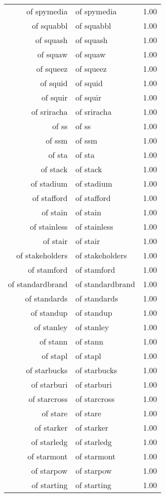\begin{table}[ht]
\begin{tabular}{rlr}
  of spymedia & of spymedia & 1.00 \\ 
  of squabbl & of squabbl & 1.00 \\ 
  of squash & of squash & 1.00 \\ 
  of squaw & of squaw & 1.00 \\ 
  of squeez & of squeez & 1.00 \\ 
  of squid & of squid & 1.00 \\ 
  of squir & of squir & 1.00 \\ 
  of sriracha & of sriracha & 1.00 \\ 
  of ss & of ss & 1.00 \\ 
  of ssm & of ssm & 1.00 \\ 
  of sta & of sta & 1.00 \\ 
  of stack & of stack & 1.00 \\ 
  of stadium & of stadium & 1.00 \\ 
  of stafford & of stafford & 1.00 \\ 
  of stain & of stain & 1.00 \\ 
  of stainless & of stainless & 1.00 \\ 
  of stair & of stair & 1.00 \\ 
  of stakeholders & of stakeholders & 1.00 \\ 
  of stamford & of stamford & 1.00 \\ 
  of standardbrand & of standardbrand & 1.00 \\ 
  of standards & of standards & 1.00 \\ 
  of standup & of standup & 1.00 \\ 
  of stanley & of stanley & 1.00 \\ 
  of stann & of stann & 1.00 \\ 
  of stapl & of stapl & 1.00 \\ 
  of starbucks & of starbucks & 1.00 \\ 
  of starburi & of starburi & 1.00 \\ 
  of starcross & of starcross & 1.00 \\ 
  of stare & of stare & 1.00 \\ 
  of starker & of starker & 1.00 \\ 
  of starledg & of starledg & 1.00 \\ 
  of starmont & of starmont & 1.00 \\ 
  of starpow & of starpow & 1.00 \\ 
  of starting & of starting & 1.00 \\ 

\end{tabular}
\end{table}
